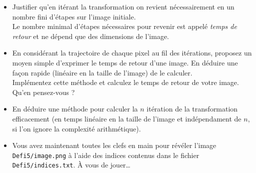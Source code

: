 \documentclass[11pt, a4paper]{article}
\begin{document}
\begin{itemize}
\item[\polygona] Justifier qu'en itérant la transformation on revient
  nécessairement en un nombre fini d'étapes sur l'image initiale.
\\Le nombre minimal d'étapes nécessaires pour revenir est
appelé \emph{temps de retour} et ne
dépend que des dimensions de l'image.
\item[\polygonb] En considérant la trajectoire de chaque pixel au fil des
  itérations, proposez un moyen simple d'exprimer le temps de retour
  d'une image. En déduire une façon rapide (linéaire en la taille de l'image) de
  le calculer.\\
  Implémentez cette méthode et calculez le temps de retour de votre image. Qu'en
  pensez-vous ?
\item[\polygonc] En déduire une méthode pour calculer la $n$\ieme{} itération de la transformation efficacement (en temps linéaire en la taille de l'image et indépendament de $n$, si l'on ignore la complexité arithmétique).
\item[\polygond] Vous avez maintenant toutes les clefs en main pour révéler l'image \texttt{Defi5/image.png} à l'aide des indices contenus dans le fichier \texttt{Defi5/indices.txt}. À vous de jouer\ldots{}
\end{itemize}

\label{lastpage}
\end{document}
